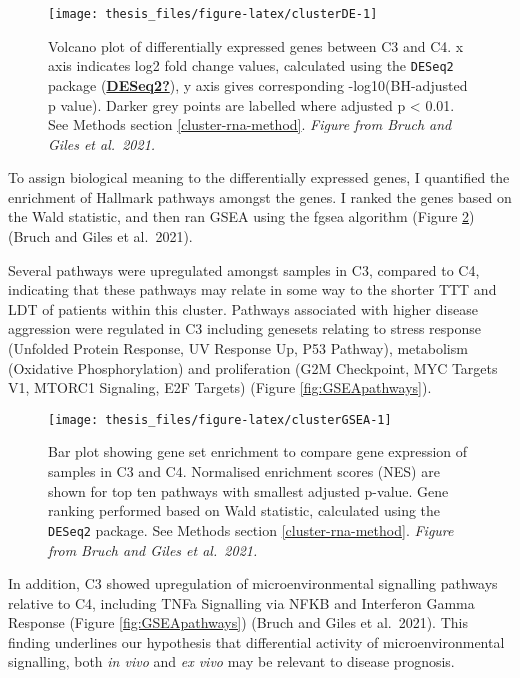 \documentclass[11pt, a4paper, twosided]{book}
\begin{document}
\begin{figure}

{\centering \texttt{[image: thesis\_files/figure-latex/clusterDE-1]} 

}

\caption{Volcano plot of differentially expressed genes between C3 and C4. x axis indicates log2 fold change values, calculated using the \texttt{DESeq2} package (\protect\hyperlink{ref-DESeq2}{\textbf{DESeq2?}}), y axis gives corresponding -log10(BH-adjusted p value). Darker grey points are labelled where adjusted p \textless{} 0.01. See Methods section \ref{cluster-rna-method}. \emph{Figure from Bruch and Giles et al.~2021.}}\label{fig:clusterDE}
\end{figure}
To assign biological meaning to the differentially expressed genes, I quantified the enrichment of Hallmark pathways amongst the genes. I ranked the genes based on the Wald statistic, and then ran GSEA using the fgsea algorithm (Figure \ref{fig:clusterGSEA}) (Bruch and Giles et al.~2021).

Several pathways were upregulated amongst samples in C3, compared to C4, indicating that these pathways may relate in some way to the shorter TTT and LDT of patients within this cluster. Pathways associated with higher disease aggression were regulated in C3 including genesets relating to stress response (Unfolded Protein Response, UV Response Up, P53 Pathway), metabolism (Oxidative Phosphorylation) and proliferation (G2M Checkpoint, MYC Targets V1, MTORC1 Signaling, E2F Targets) (Figure \ref{fig:GSEApathways}).


\begin{figure}

{\centering \texttt{[image: thesis\_files/figure-latex/clusterGSEA-1]} 

}

\caption{Bar plot showing gene set enrichment to compare gene expression of samples in C3 and C4. Normalised enrichment scores (NES) are shown for top ten pathways with smallest adjusted p-value. Gene ranking performed based on Wald statistic, calculated using the \texttt{DESeq2} package. See Methods section \ref{cluster-rna-method}. \emph{Figure from Bruch and Giles et al.~2021. }}\label{fig:clusterGSEA}
\end{figure}
In addition, C3 showed upregulation of microenvironmental signalling pathways relative to C4, including TNFa Signalling via NFKB and Interferon Gamma Response (Figure \ref{fig:GSEApathways}) (Bruch and Giles et al.~2021). This finding underlines our hypothesis that differential activity of microenvironmental signalling, both \emph{in vivo} and \emph{ex vivo} may be relevant to disease prognosis.
\end{document}
